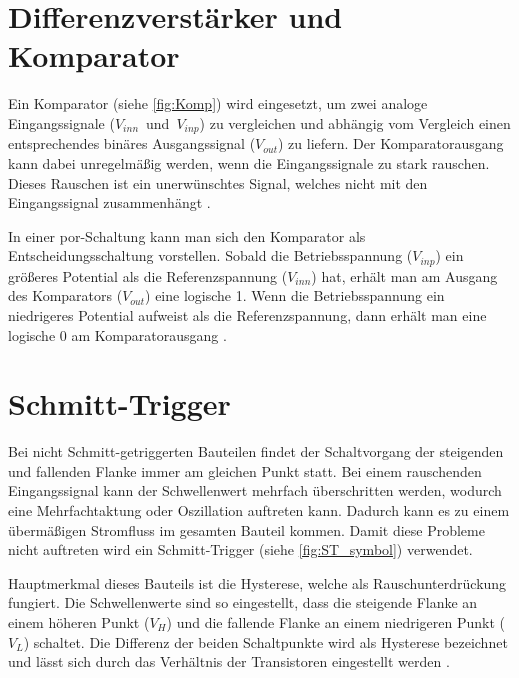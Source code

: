 \section{Differenzverstärker und Komparator}
Ein Komparator (siehe \autoref{fig:Komp}) wird eingesetzt, um zwei analoge Eingangssignale \mbox{($V_{inn}$ und $V_{inp}$)} zu vergleichen und abhängig vom Vergleich einen entsprechendes binäres Ausgangssignal ($V_{out}$) zu liefern. Der Komparatorausgang kann dabei unregelmäßig werden, wenn die Eingangssignale zu stark rauschen. Dieses Rauschen ist ein unerwünschtes Signal, welches nicht mit den Eingangssignal zusammenhängt \cite{7489413}. 

In einer \gls{por}-Schaltung kann man sich den Komparator als Entscheidungsschaltung vorstellen. Sobald die Betriebsspannung ($V_{inp}$) ein größeres Potential als die Referenzspannung ($V_{inn}$) hat, erhält man am Ausgang des Komparators ($V_{out}$) eine logische 1. Wenn die Betriebsspannung ein niedrigeres Potential aufweist als die Referenzspannung, dann erhält man eine logische 0 am Komparatorausgang \cite{CircuitDesigLayoutAndSimulation}.

\section{Schmitt-Trigger}
Bei nicht Schmitt-getriggerten Bauteilen findet der Schaltvorgang der steigenden und fallenden Flanke immer am gleichen Punkt statt. Bei einem rauschenden Eingangssignal kann der Schwellenwert mehrfach überschritten werden, wodurch eine Mehrfachtaktung oder Oszillation auftreten kann. Dadurch kann es zu einem übermäßigen Stromfluss im gesamten Bauteil kommen. Damit diese Probleme nicht auftreten wird ein Schmitt-Trigger (siehe \autoref{fig:ST_symbol}) verwendet. 

Hauptmerkmal dieses Bauteils ist die Hysterese, welche als Rauschunterdrückung fungiert. Die Schwellenwerte sind so eingestellt, dass die steigende Flanke an einem höheren Punkt ($V_H$) und die fallende Flanke an einem niedrigeren Punkt ($V_L$) schaltet. Die Differenz der beiden Schaltpunkte wird als Hysterese bezeichnet und lässt sich durch das Verhältnis der Transistoren eingestellt werden \cite{CMOS_VLSI_Design}\cite{CircuitDesigLayoutAndSimulation}\cite{texasST}.

